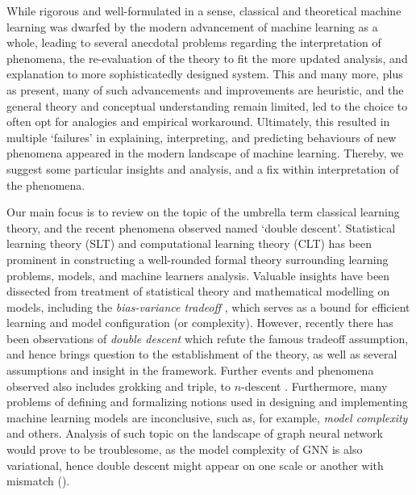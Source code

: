 \documentclass[10pt]{article} %
\begin{document}
While rigorous and well-formulated in a sense, classical and theoretical machine learning was dwarfed by the modern advancement of machine learning as a whole, leading to several anecdotal problems regarding the interpretation of phenomena, the re-evaluation of the theory to fit the more updated analysis, and explanation to more sophisticatedly designed system. This and many more, plus as present, many of such advancements and improvements are heuristic, and the general theory and conceptual understanding remain limited, led to the choice to often opt for analogies and empirical workaround. Ultimately, this resulted in multiple `failures' in explaining, interpreting, and predicting behaviours of new phenomena appeared in the modern landscape of machine learning. Thereby, we suggest some particular insights and analysis, and a fix within interpretation of the phenomena. 

Our main focus is to review on the topic of the umbrella term classical learning theory, and the recent phenomena observed named `double descent'. Statistical learning theory (SLT) and computational learning theory (CLT) \cite{Vapnik1999-VAPTNO,10.5555/2371238,10.5555/2621980,STL_Hajek_Maxim_2021,bousquet2020theoryuniversallearning} has been prominent in constructing a well-rounded formal theory surrounding learning problems, models, and machine learners analysis. Valuable insights have been dissected from treatment of statistical theory and mathematical modelling on models, including the \textit{bias-variance tradeoff} \cite{6797087,Domingos2000AUB}, which serves as a bound for efficient learning and model configuration (or complexity). However, recently there has been observations of \textit{double descent} \cite{belkin_reconciling_2019,schaeffer_double_2023,nakkiran_deep_2019,lafon_understanding_2024} which refute the famous tradeoff assumption, and hence brings question to the establishment of the theory, as well as several assumptions and insight in the framework. Further events and phenomena observed also includes grokking and triple, to $n$-descent \cite{davies_unifying_2023,d_ascoli_triple_2020}. Furthermore, many problems of defining and formalizing notions used in designing and implementing machine learning models are inconclusive, such as, for example, \textit{model complexity} and others. Analysis of such topic on the landscape of graph neural network would prove to be troublesome, as the model complexity of GNN is also variational, hence double descent might appear on one scale or another with mismatch (\cite{shi2024homophilymodulatesdoubledescent}). 
\end{document}

